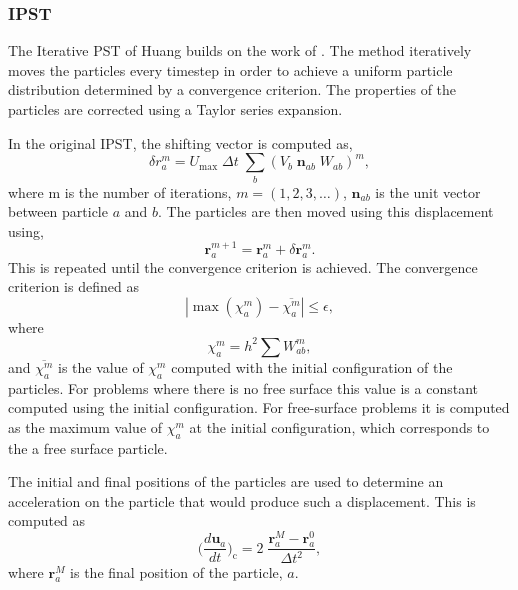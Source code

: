 \documentclass[preprint,12pt]{elsarticle}
\newcommand{\ten}[1]{\ensuremath{\mathbf{#1}}}
\begin{document}
\subsubsection{IPST}
\label{sec:ipst}

The Iterative PST of Huang \cite{huang_kernel_2019} builds on the work of
\citet{xu2009accuracy}. The method iteratively moves the particles every
timestep in order to achieve a uniform particle distribution determined by a
convergence criterion. The properties of the particles are corrected using a
Taylor series expansion.

In the original IPST, the shifting vector is computed as,
\begin{equation}
  \label{eq:ipst_step1}
  \delta r_a^m = U_{\max} \; \Delta t \; \sum_b (V_b \; \ten{n}_{ab} \; W_{ab})^m,
\end{equation}
where m is the number of iterations, $m=(1, 2, 3, \dots)$, $\ten{n}_{ab}$ is
the unit vector between particle $a$ and $b$. The particles are then moved
using this displacement using,
\begin{equation}
  \label{eq:ipst_step2}
  \ten{r}_a^{m+1} = \ten{r}_a^{m} + \delta \ten{r}_a^{m}.
\end{equation}
This is repeated until the convergence criterion is achieved. The convergence
criterion is defined as
\begin{equation}
  \label{eq:ipst_convergence_criterion}
  |\max(\chi_a^m) - \overline{\chi_a^m}| \leq \epsilon,
\end{equation}
where
\begin{equation}
  \label{eq:ipst_chi_0}
  \chi_a^m = h^2 \sum W^m_{ab},
\end{equation}
%
and $\overline{\chi_a^m}$ is the value of $\chi_a^m$ computed with the initial
configuration of the particles. For problems where there is no free surface
this value is a constant computed using the initial configuration. For
free-surface problems it is computed as the maximum value of $\chi_a^m$ at the
initial configuration, which corresponds to the a free surface particle.

The initial and final positions of the particles are used to determine an
acceleration on the particle that would produce such a displacement.  This is
computed as
\begin{equation}
  \label{eq:ipst_force}
  \bigg(\frac{d \ten{u}_a}{dt}\bigg)_{\text{c}} =
  2 \; \frac{\ten{r}_a^{M} - \ten{r}_a^0}{\Delta t^2},
\end{equation}
where $\ten{r}_a^M$ is the final position of the particle, $a$.
\end{document}
